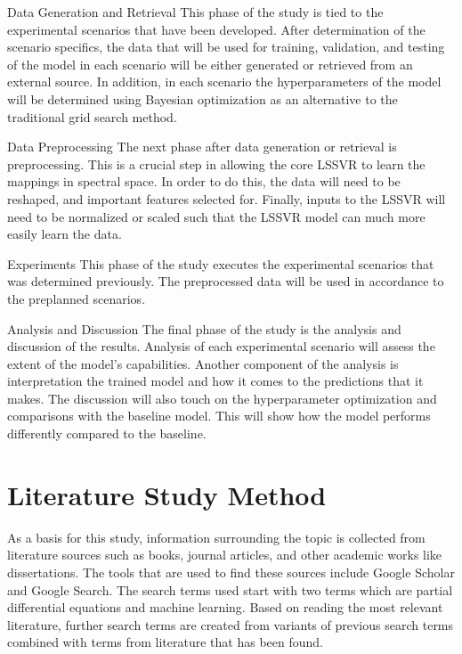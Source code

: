 \begin{numdesc}
      \item[Data Generation and Retrieval]
      This phase of the study is tied to the experimental scenarios that have been developed. After determination of the scenario specifics, the data that will be used for training, validation, and testing of the model in each scenario will be either generated or retrieved from an external source. In addition, in each scenario the hyperparameters of the model will be determined using Bayesian optimization as an alternative to the traditional grid search method.

      \item[Data Preprocessing]
      The next phase after data generation or retrieval is preprocessing. This is a crucial step in allowing the core LSSVR to learn the mappings in spectral space. In order to do this, the data will need to be reshaped, and important features selected for. Finally, inputs to the LSSVR will need to be normalized or scaled such that the LSSVR model can much more easily learn the data.

      \item[Experiments]
      This phase of the study executes the experimental scenarios that was determined previously. The preprocessed data will be used in accordance to the preplanned scenarios.

      \item[Analysis and Discussion]
      The final phase of the study is the analysis and discussion of the results. Analysis of each experimental scenario will assess the extent of the model's capabilities. Another component of the analysis is interpretation the trained model and how it comes to the predictions that it makes. The discussion will also touch on the hyperparameter optimization and comparisons with the baseline model. This will show how the model performs differently compared to the baseline.
\end{numdesc}

\section{Literature Study Method}
\noindent As a basis for this study, information surrounding the topic is collected from literature sources such as books, journal articles, and other academic works like dissertations. The tools that are used to find these sources include Google Scholar and Google Search. The search terms used start with two terms which are partial differential equations and machine learning. Based on reading the most relevant literature, further search terms are created from variants of previous search terms combined with terms from literature that has been found.

